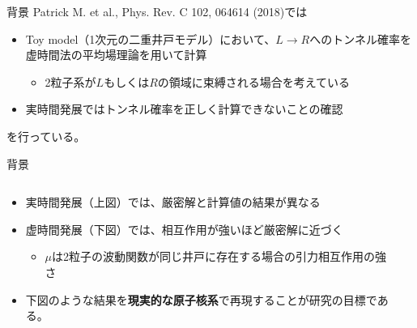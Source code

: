 \documentclass[11pt,aspectratio=169,xcolor=dvipsnames,table,dvipdfmx]{beamer}
\theoremstyle{definition}
\begin{document}
\begin{frame}{背景}
  Patrick M. et al., Phys. Rev. C 102, 064614 (2018)では
  \begin{itemize}
    \item Toy model（1次元の二重井戸モデル）において、$L\to R$へのトンネル確率を虚時間法の平均場理論を用いて計算
    \begin{itemize}
      \item 2粒子系が$L$もしくは$R$の領域に束縛される場合を考えている
    \end{itemize}
    \item 実時間発展ではトンネル確率を正しく計算できないことの確認
  \end{itemize}
  を行っている。
  \begin{center}
  \end{center}
\end{frame}

\begin{frame}{背景}
  \begin{columns}[t]
    \begin{column}{.5\textwidth}
      \begin{itemize}
        \item 実時間発展（上図）では、{\color{blue}厳密解}と{\color{orange}計算値}の結果が異なる
        \item 虚時間発展（下図）では、相互作用が強いほど{\color{blue}厳密解}に近づく
        \begin{itemize}
          \item $\mu$は2粒子の波動関数が同じ井戸に存在する場合の引力相互作用の強さ
        \end{itemize}
        \item 下図のような結果を\textbf{現実的な原子核系}で再現することが研究の目標である。
      \end{itemize}
    \end{column}
    \begin{column}{.5\textwidth}
    \end{column}
  \end{columns}
\end{frame}
\end{document}

